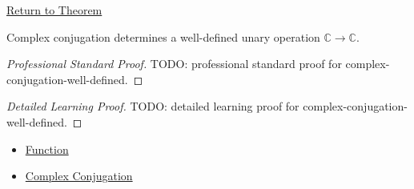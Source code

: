 \newpage
{}
\label{prf:complex-conjugation-well-defined}

\begin{remark*}[Return]
\hyperref[thm:complex-conjugation-well-defined]{Return to Theorem}
\end{remark*}

\begin{theorem*}
Complex conjugation determines a well-defined unary operation
\(\mathbb{C}\to\mathbb{C}\).
\end{theorem*}

\begin{proof}[Professional Standard Proof]
\LRAProofBodyStart
TODO: professional standard proof for complex-conjugation-well-defined.
\end{proof}

\begin{proof}[Detailed Learning Proof]
\LRAProofBodyStart
TODO: detailed learning proof for complex-conjugation-well-defined.
\end{proof}

\begin{remark*}
\end{remark*}

\begin{dependencies}
\begin{itemize}
  \item \hyperref[def:function]{Function}
  \item \hyperref[def:complex-conjugation]{Complex Conjugation}
\end{itemize}
\end{dependencies}

\clearpage
